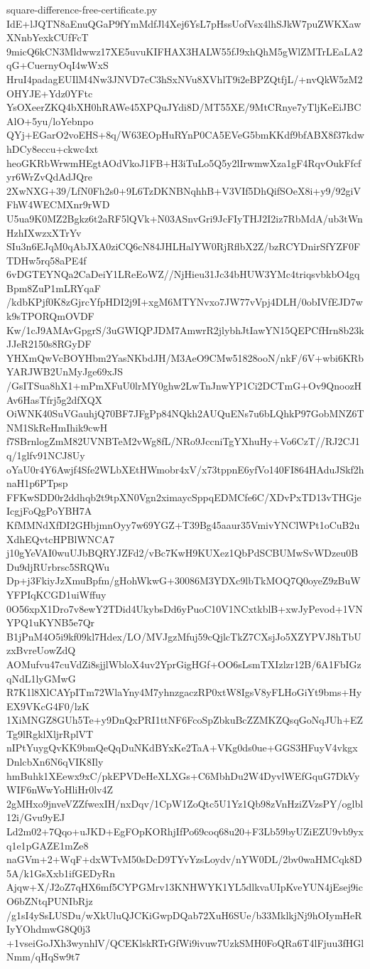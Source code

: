 \documentclass[11pt]{article}
\theoremstyle{definition}
\theoremstyle{remark}
\begin{document}
\begin{filecontents*}[overwrite]{square-difference-free-certificate.py}
IdE+lJQTN8aEnuQGaP9fYmMdfJl4Xej6YsL7pHssUofVsx4lhSJkW7puZWKXawXNnbYexkCUfFcT
9micQ6kCN3Mldwwz17XE5uvuKIFHAX3HALW55fJ9xhQhM5gWlZMTrLEaLA2qG+CuernyOqI4wWxS
HruI4padagEUIlM4Nw3JNVD7cC3hSxNVu8XVhlT9i2eBPZQtfjL/+nvQkW5zM2OHYJE+Ydz0YFtc
YsOXeerZKQ4bXH0hRAWe45XPQuJYdi8D/MT55XE/9MtCRnye7yTljKeEiJBCAlO+5yu/loYebnpo
QYj+EGarO2voEHS+8q/W63EOpHuRYnP0CA5EVeG5bmKKdf9bfABX8f37kdwhDCy8eccu+ckwc4xt
heoGKRbWrwmHEgtAOdVkoJ1FB+H3iTuLo5Q5y2lIrwmwXza1gF4RqvOukFfcfyr6WrZvQdAdJQre
2XwNXG+39/LfN0Fh2s0+9L6TzDKNBNqhhB+V3VIf5DhQifSOeX8i+y9/92giVFhW4WECMXnr9rWD
U5ua9K0MZ2Bgkz6t2aRF5lQVk+N03ASnvGri9JcFIyTHJ2I2iz7RbMdA/ub3tWnHzhIXwzxXTrYv
SIu3n6EJqM0qAbJXA0ziCQ6cN84JHLHalYW0RjRflbX2Z/bzRCYDnirSfYZF0FTDHw5rq58aPE4f
6vDGTEYNQa2CaDeiY1LReEoWZ//NjHieu31Jc34bHUW3YMc4triqsvbkbO4gqBpm8ZuP1mLRYqaF
/kdbKPjf0K8zGjrcYfpHDI2j9I+xgM6MTYNvxo7JW77vVpj4DLH/0obIVfEJD7wk9sTPORQmOVDF
Kw/1cJ9AMAvGpgrS/3uGWIQPJDM7AmwrR2jlybhJtIawYN15QEPCfHrn8b23kJJeR2150s8RGyDF
YHXmQwVcBOYHbm2YasNKbdJH/M3AeO9CMw51828ooN/nkF/6V+wbi6KRbYARJWB2UnMyJge69xJS
/GsITSua8hX1+mPmXFuU0lrMY0ghw2LwTnJnwYP1Ci2DCTmG+Ov9QnoozHAv6HasTfrj5g2dfXQX
OiWNK40SuVGauhjQ70BF7JFgPp84NQkh2AUQuENs7u6bLQhkP97GobMNZ6TNM1SkReHmIhik9cwH
f7SBrnlogZmM82UVNBTeM2vWg8fL/NRo9JccniTgYXhuHy+Vo6CzT//RJ2CJ1q/1glfv91NCJ8Uy
oYaU0r4Y6Awjf4Sfe2WLbXEtHWmobr4xV/x73tppnE6yfVo140FI864HAduJSkf2hnaH1p6PTpsp
FFKwSDD0r2ddhqb2t9tpXN0Vgn2ximaycSppqEDMCfe6C/XDvPxTD13vTHGjeIcgjFoQgPoYBH7A
KfMMNdXfDI2GHbjmnOyy7w69YGZ+T39Bg45aaur35VmivYNClWPt1oCuB2uXdhEQvtcHPBlWNCA7
j10gYeVAI0wuUJbBQRYJZFd2/vBc7KwH9KUXez1QbPdSCBUMwSvWDzeu0BDu9djRUrbrsc5SRQWu
Dp+j3FkiyJzXmuBpfm/gHohWkwG+30086M3YDXc9lbTkMOQ7Q0oyeZ9zBuWYFPIqKCGD1uiWffuy
0O56xpX1Dro7v8ewY2TDid4UkybsDd6yPuoC10V1NCxtkblB+xwJyPevod+1VNYPQ1uKYNB5e7Qr
B1jPnM4O5i9kf09kl7Hdex/LO/MVJgzMfuj59cQjlcTkZ7CXsjJo5XZYPVJ8hTbUzxBvreUowZdQ
AOMufvu47cuVdZi8sjjlWbloX4uv2YprGigHGf+OO6sLsmTXIzlzr12B/6A1FbIGzqNdL1lyGMwG
R7K1l8XlCAYpITm72WlaYny4M7yhnzgaczRP0xtW8IgsV8yFLHoGiYt9bms+HyEX9VKcG4F0/lzK
1XiMNGZ8GUh5Te+y9DnQxPRI1ttNF6FcoSpZbkuBcZZMKZQsqGoNqJUh+EZTg9lRgklXljrRplVT
nIPtYuygQvKK9bmQeQqDuNKdBYxKe2TaA+VKg0ds0ue+GGS3HFuyV4vkgxDnlcbXn6N6qVIK8Ily
hmBuhk1XEewx9xC/pkEPVDeHeXLXGs+C6MbhDu2W4DyvlWEfGquG7DkVyWIF6nWwYoHliHr0lv4Z
2gMHxo9jnveVZZfwexIH/nxDqv/1CpW1ZoQtc5U1Yz1Qb98zVnHziZVzsPY/oglbl12i/Gvu9yEJ
Ld2m02+7Qqo+uJKD+EgFOpKORhjIfPo69coq68u20+F3Lb59byUZiEZU9vb9yxq1e1pGAZE1mZe8
naGVm+2+WqF+dxWTvM50sDcD9TYvYzsLoydv/nYW0DL/2bv0waHMCqk8D5A/k1GsXxb1ifGEDyRn
Ajqw+X/J2oZ7qHX6mf5CYPGMrv13KNHWYK1YL5dlkvaUIpKveYUN4jEsej9icO6bZNtqPUNIbRjz
/g1sI4ySsLUSDu/wXkUluQJCKiGwpDQab72XuH6SUe/b33MklkjNj9hOIymHeRIyYOhdmwG8Q0j3
+1vseiGoJXh3wynhlV/QCEKlskRTrGfWi9ivuw7UzkSMH0FoQRa6T4lFjuu3fHGlNmm/qHqSw9t7

\end{filecontents*}
\end{document}
